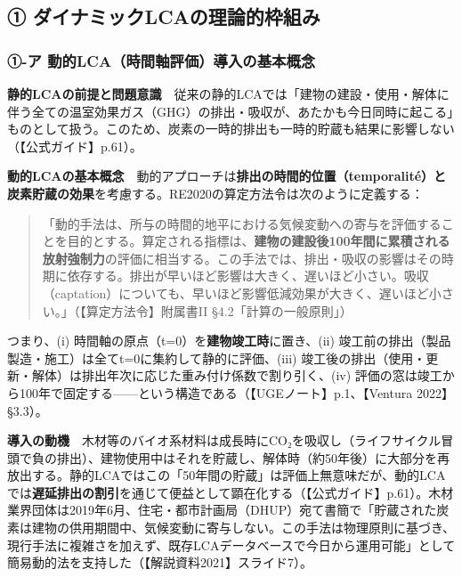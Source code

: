 \documentclass[11pt]{ltjsarticle}
\begin{document}
\hypertarget{ux2460-ux30c0ux30a4ux30caux30dfux30c3ux30aflcaux306eux7406ux8ad6ux7684ux67a0ux7d44ux307f}{%
\subsection{①
ダイナミックLCAの理論的枠組み}\label{ux2460-ux30c0ux30a4ux30caux30dfux30c3ux30aflcaux306eux7406ux8ad6ux7684ux67a0ux7d44ux307f}}

\hypertarget{ux2460-ux30a2-ux52d5ux7684lcaux6642ux9593ux8ef8ux8a55ux4fa1ux5c0eux5165ux306eux57faux672cux6982ux5ff5}{%
\subsubsection{①-ア
動的LCA（時間軸評価）導入の基本概念}\label{ux2460-ux30a2-ux52d5ux7684lcaux6642ux9593ux8ef8ux8a55ux4fa1ux5c0eux5165ux306eux57faux672cux6982ux5ff5}}

\textbf{静的LCAの前提と問題意識}　従来の静的LCAでは「建物の建設・使用・解体に伴う全ての温室効果ガス（GHG）の排出・吸収が、あたかも今日同時に起こる」ものとして扱う。このため、炭素の一時的排出も一時的貯蔵も結果に影響しない（【公式ガイド】p.61）。

\textbf{動的LCAの基本概念}　動的アプローチは\textbf{排出の時間的位置（temporalité）と炭素貯蔵の効果}を考慮する。RE2020の算定方法令は次のように定義する：

\begin{quote}
「動的手法は、所与の時間的地平における気候変動への寄与を評価することを目的とする。算定される指標は、\textbf{建物の建設後100年間に累積される放射強制力}の評価に相当する。この手法では、排出・吸収の影響はその時期に依存する。排出が早いほど影響は大きく、遅いほど小さい。吸収（captation）についても、早いほど影響低減効果が大きく、遅いほど小さい。」（【算定方法令】附属書II
§4.2「計算の一般原則」）
\end{quote}

つまり、(i) 時間軸の原点（t=0）を\textbf{建物竣工時}に置き、(ii)
竣工前の排出（製品製造・施工）は全てt=0に集約して静的に評価、(iii)
竣工後の排出（使用・更新・解体）は排出年次に応じた重み付け係数で割り引く、(iv)
評価の窓は竣工から100年で固定する------という構造である（【UGEノート】p.1、【Ventura
2022】§3.3）。

\textbf{導入の動機}　木材等のバイオ系材料は成長時にCO₂を吸収し（ライフサイクル冒頭で負の排出）、建物使用中はそれを貯蔵し、解体時（約50年後）に大部分を再放出する。静的LCAではこの「50年間の貯蔵」は評価上無意味だが、動的LCAでは\textbf{遅延排出の割引}を通じて便益として顕在化する（【公式ガイド】p.61）。木材業界団体は2019年6月、住宅・都市計画局（DHUP）宛て書簡で「貯蔵された炭素は建物の供用期間中、気候変動に寄与しない。この手法は物理原則に基づき、現行手法に複雑さを加えず、既存LCAデータベースで今日から運用可能」として簡易動的法を支持した（【解説資料2021】スライド7）。
\end{document}
